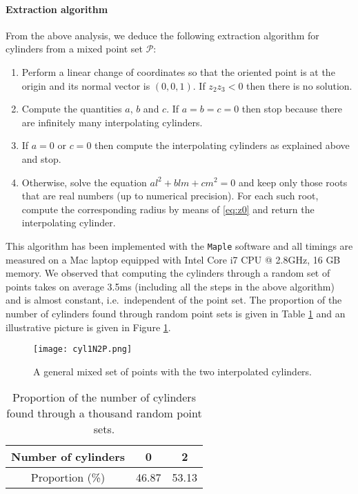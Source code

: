 \documentclass[5p]{elsarticle}
\newcommand\Pc{\mathcal P}
\newcommand{\com}[1]{{\color{black} #1}}
\newcommand{\lb}[1]{{\color{black} #1}}
\begin{document}
\paragraph{Extraction algorithm} From the above analysis, we deduce the following extraction algorithm \com{for cylinders} from a mixed point set $\Pc$:
\begin{enumerate}
	\item Perform a linear change of coordinates so that the oriented point is at the origin and its normal vector is $(0,0,1)$. If $z_2z_3<0$ then there is no solution.
	\item Compute the quantities $a$, $b$ and $c$. If $a=b=c=0$ then stop because there are infinitely many interpolating cylinders. 
	\item If $a=0$ or $c=0$ then compute the interpolating cylinders as explained above and stop.
	\item Otherwise, solve the equation $al^2+blm+cm^2=0$ and keep only those roots that are real numbers (up to numerical precision). For each such root, compute the corresponding radius by means of \eqref{eq:z0} and return the interpolating cylinder. 
\end{enumerate} 

This algorithm has been implemented with the {\tt Maple} software and all timings are measured on a Mac laptop equipped with Intel Core i7 CPU @ 2.8GHz, 16 GB memory. We observed that \com{computing} the cylinders through a random set of points takes \com{on average} 3.5ms \com{(including all the steps \lb{in the above algorithm})} and is almost constant, \com{i.e.~independent} of the point set. 
The proportion of the number of cylinders found through random point sets is given in Table \ref{tab:cylinders} and an illustrative picture is given in Figure \ref{fig:cyl1N2P}.

\begin{figure}[ht!]
	\centering
	\texttt{[image: cyl1N2P.png]}		
\caption{A general mixed set of points with the two interpolated cylinders.}\label{fig:cyl1N2P}	
\end{figure}

\begin{table}[ht!]
\begin{center}
\begin{tabular}{c|c|c|}
Number of cylinders	 & 0 & 2  \\ 
	 \hline
Proportion (\%)	 &  46.87  & 53.13 \\
\hline	
\end{tabular}
\caption{Proportion of the number of cylinders found through a thousand random point sets.}\label{tab:cylinders}
\end{center}
\end{table}
\end{document}
